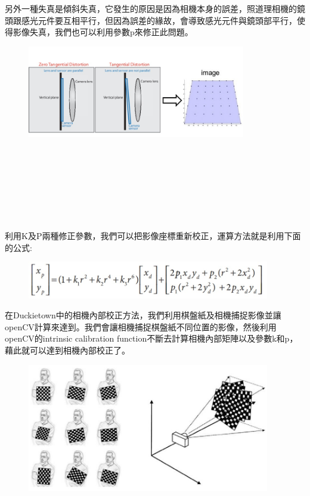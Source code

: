 \documentclass{article}
\begin{document}
另外一種失真是傾斜失真，它發生的原因是因為相機本身的誤差，照道理相機的鏡頭跟感光元件要互相平行，但因為誤差的緣故，會導致感光元件與鏡頭部平行，使得影像失真，我們也可以利用參數p來修正此問題。
\\
\begin{figure}[htp]
    \begin{center}
        \includegraphics[width=270pt]{pic/圖片10.jpg}
    \end{center}
\end{figure}
\\\\\\\\\\\\\\
利用K及P兩種修正參數，我們可以把影像座標重新校正，運算方法就是利用下面的公式:
\\
\begin{figure}[htp]
    \begin{center}
        \includegraphics[width=300pt]{pic/圖片11.jpg}
    \end{center}
\end{figure}

在Duckietown中的相機內部校正方法，我們利用棋盤紙及相機捕捉影像並讓openCV計算來達到。我們會讓相機捕捉棋盤紙不同位置的影像，然後利用openCV的intrinsic calibration function不斷去計算相機內部矩陣以及參數k和p，藉此就可以達到相機內部校正了。
\begin{figure}[htp]
    \begin{center}
        \includegraphics[width=300pt]{pic/圖片12.jpg}
    \end{center}
\end{figure}
\end{document}
